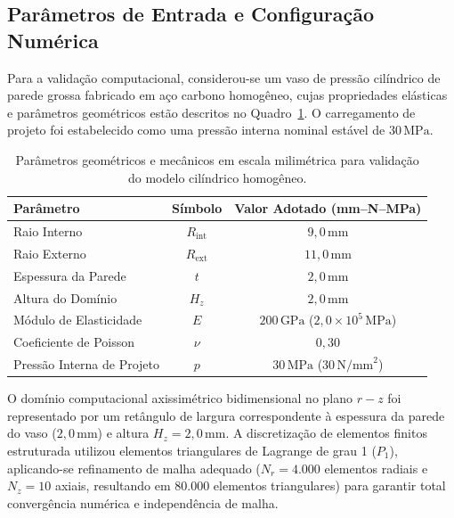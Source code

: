 \subsection{Parâmetros de Entrada e Configuração Numérica}

Para a validação computacional, considerou-se um vaso de pressão cilíndrico de parede grossa fabricado em aço carbono homogêneo, cujas propriedades elásticas e parâmetros geométricos estão descritos no Quadro~\ref{tab:parametros_validacao_v3}. O carregamento de projeto foi estabelecido como uma pressão interna nominal estável de $30 \, \text{MPa}$.

\begin{table}[htbp]
  \centering
  \caption{Parâmetros geométricos e mecânicos em escala milimétrica para validação do modelo cilíndrico homogêneo.}
  \label{tab:parametros_validacao_v3}
  \begin{tabular}{l c c}
    \hline
    \textbf{Parâmetro} & \textbf{Símbolo} & \textbf{Valor Adotado (mm--N--MPa)} \\ \hline
    Raio Interno & $R_{\text{int}}$ & $9,0 \, \text{mm}$ \\ \hline
    Raio Externo & $R_{\text{ext}}$ & $11,0 \, \text{mm}$ \\ \hline
    Espessura da Parede & $t$ & $2,0 \, \text{mm}$ \\ \hline
    Altura do Domínio & $H_z$ & $2,0 \, \text{mm}$ \\ \hline
    Módulo de Elasticidade & $E$ & $200 \, \text{GPa}$ ($2,0 \times 10^{5} \, \text{MPa}$) \\ \hline
    Coeficiente de Poisson & $\nu$ & $0,30$ \\ \hline
    Pressão Interna de Projeto & $p$ & $30 \, \text{MPa}$ ($30 \, \text{N/mm}^2$) \\ \hline
  \end{tabular}
\end{table}

O domínio computacional axissimétrico bidimensional no plano $r-z$ foi representado por um retângulo de largura correspondente à espessura da parede do vaso ($2,0 \, \text{mm}$) e altura $H_z = 2,0 \, \text{mm}$. A discretização de elementos finitos estruturada utilizou elementos triangulares de Lagrange de grau 1 ($P_1$), aplicando-se refinamento de malha adequado ($N_r = 4.000$ elementos radiais e $N_z = 10$ axiais, resultando em $80.000$ elementos triangulares) para garantir total convergência numérica e independência de malha.

